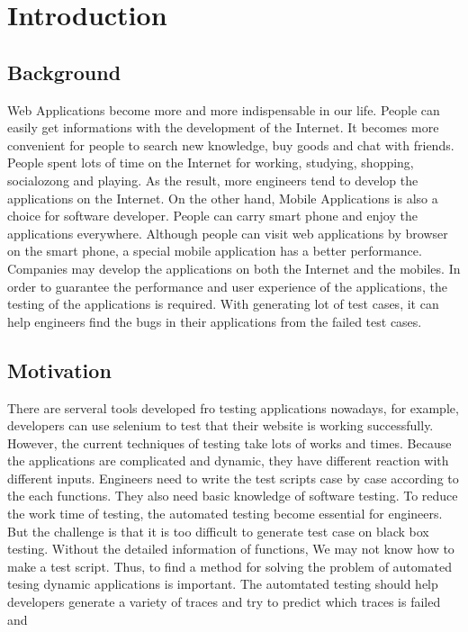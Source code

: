 
\chapter{Introduction}\label{ch:introduction}

\section{Background}

Web Applications become more and more indispensable in our life.
People can easily get informations with the development of the Internet.
It becomes more convenient for people to search new knowledge, buy goods and chat with friends.
People spent lots of time on the Internet for working, studying, shopping, socialozong and playing.
As the result, more engineers tend to develop the applications on the Internet.
On the other hand, Mobile Applications is also a choice for software developer.
People can carry smart phone and enjoy the applications everywhere.
Although people can visit web applications by browser on the smart phone,
a special mobile application has a better performance.
Companies may develop the applications on both the Internet and the mobiles.
In order to guarantee the performance and user experience of the applications,
the testing of the applications is required.
With generating lot of test cases, 
it can help engineers find the bugs in their applications from the failed test cases.

\clearpage

\section{Motivation}

There are serveral tools developed fro testing applications nowadays,
for example, developers can use selenium to test that their website is working successfully.
However, the current techniques of testing take lots of works and times.
Because the applications are complicated and dynamic,
they have different reaction with different inputs.
Engineers need to write the test scripts case by case according to the each functions.
They also need basic knowledge of software testing.
To reduce the work time of testing, the automated testing become essential for engineers.
But the challenge is that it is too difficult to generate test case on black box testing.
Without the detailed information of functions,
We may not know how to make a test script.
Thus, to find a method for solving the problem of automated tesing dynamic applications is important.
The automtated testing should help developers generate a variety of traces 
and try to predict which traces is failed and 


